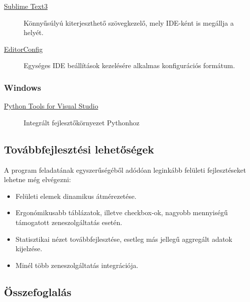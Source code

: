 \begin{description}
	\item[\href{http://www.sublimetext.com/3}{Sublime Text3}] Könnyűsúlyú kiterjeszthető szövegkezelő, mely IDE-ként is megállja a helyét.
	\item[\href{http://editorconfig.org/}{EditorConfig}] Egységes IDE beállítások kezelésére alkalmas konfigurációs formátum.
\end{description}


\subsubsection{Windows}
\label{ssub:windows}

\begin{description}
	\item[\href{http://pytools.codeplex.com/wikipage?title=PTVS\%20Installation}{Python Tools for Visual Studio}] Integrált fejlesztőkörnyezet Pythonhoz
\end{description}



\subsection{Továbbfejlesztési lehetőségek}
\label{sub:tovabbfejlesztes}

A program feladatának egyszerűségéből adódóan leginkább felületi fejlesztéseket lehetne még elvégezni:

\begin{itemize}
	\item Felületi elemek dinamikus átmérezetése.
	\item Ergonómikusabb táblázatok, illetve checkbox-ok, nagyobb mennyiségű támogatott zeneszolgáltatás esetén.
	\item Statisztikai nézet továbbfejlesztése, esetleg más jellegű aggregált adatok kijelzése.
	\item Minél több zeneszolgáltatás integrációja.
\end{itemize}


\subsection{Összefoglalás}
\label{sub:osszefoglalas}

